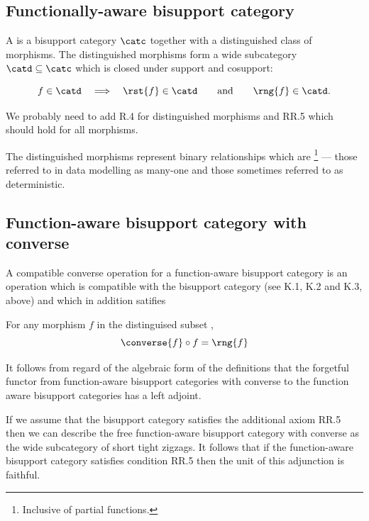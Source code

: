 \subsection{Functionally-aware bisupport category}
\begin{definition}
A  is a bisupport
category $\catc$ together with a distinguished class of morphisms.
The distinguished morphisms form a wide subcategory $\catd\subseteq\catc$
which is closed under support and cosupport:

$$
f\in\catd
\quad\Longrightarrow\quad
\rst{f}\in\catd
\qquad\text{and}\qquad
\rng{f}\in\catd.
$$

We probably need to add R.4 for distinguished morphisms and RR.5 which should hold for all morphisms.

The distinguished morphisms represent binary relationships which are
\footnote{Inclusive of partial functions.} --- those referred to in data modelling as many-one and those sometimes referred to as deterministic.
\end{definition}

\subsection{Function-aware bisupport category with converse}

\begin{definition} 
A compatible converse operation for a function-aware bisupport category \catcw is
an operation \converseItself which is compatible with the bisupport
category \catcw (see K.1, K.2 and K.3, above)
and which in addition satifies 

\noindent [K.4]\quad
For any morphism $f$ in the distinguised subset \catd,
\[
\converse{f} \circ f = \rng{f}
\]
\end{definition}

It follows from regard of the algebraic form of the definitions that 
the forgetful functor from function-aware bisupport categories with converse to the function aware bisupport categories has a left adjoint.

If we assume that the bisupport category satisfies the additional axiom RR.5 then we can describe the free function-aware bisupport category with converse as the wide subcategory of short tight zigzags. It follows that if the function-aware bisupport category satisfies condition RR.5 then the unit of this adjunction is faithful. 

